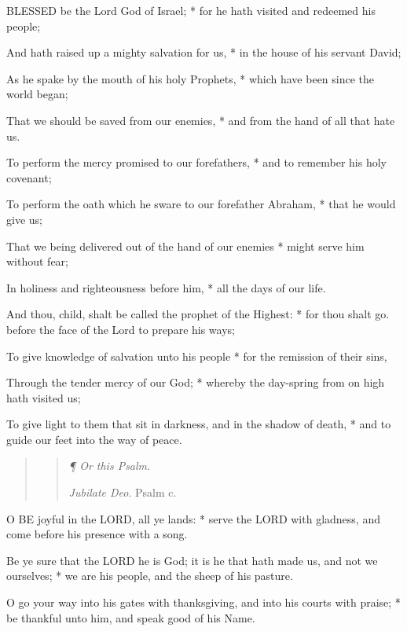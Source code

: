 BLESSED
be the Lord God of Israel; * for he hath visited and redeemed his people;

And hath raised up a mighty salvation for us, * in
the house of his servant David;

As he spake by the mouth of his holy Prophets, * which
have been since the world began;

That we should be saved from our enemies, * and from
the hand of all that hate us.

To perform the mercy promised to our forefathers, * and to remember his
holy covenant;

To perform the oath which he sware to our forefather
Abraham, * that he would give us;

That we being delivered out of the hand of our enemies
* might serve him without fear;

In holiness and righteousness before him, * all the
days of our life.

And thou, child, shalt be called the prophet of the
Highest: * for thou shalt go. before the face of the Lord to prepare his
ways;

To give knowledge of salvation unto his people * for
the remission of their sins,

Through the tender mercy of our God; * whereby the
day-spring from on high hath visited us;

To give light to them that sit in darkness, and in
the shadow of death, * and to guide our feet into the way of peace.

\begin{quote}

\begin{quote}

\emph{¶ Or this Psalm.}

\emph{Jubilate
Deo}. Psalm c.

\end{quote}

\end{quote}

O
BE joyful in the LORD, all ye lands: * serve the
LORD with gladness, and come before his presence
with a song.

Be ye sure that the LORD he
is God; it is he that hath made us, and not we ourselves; * we are his
people, and the sheep of his pasture.

O go your way into his gates with thanksgiving, and
into his courts with praise; * be thankful unto him, and speak good of
his Name.

